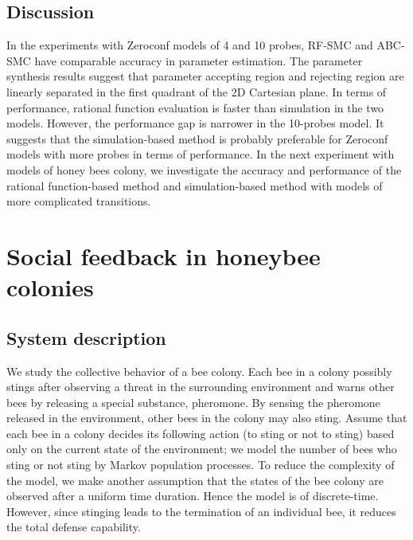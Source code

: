 \subsection{Discussion}
In the experiments with Zeroconf models of 4 and 10 probes, RF-SMC and ABC-SMC have comparable
accuracy in parameter estimation. The parameter synthesis results suggest that parameter accepting
region and rejecting region are linearly separated in the first quadrant of the 2D Cartesian plane.
In terms of performance, rational function evaluation is faster than simulation in the two models.
However, the performance gap is narrower in the 10-probes model. It suggests that the
simulation-based method is probably preferable for Zeroconf models with more probes in terms of
performance. In the next experiment with models of honey bees colony, we investigate the accuracy
and performance of the rational function-based method and simulation-based method with models of
more complicated transitions.

\section{Social feedback in honeybee colonies}
\subsection{System description}
We study the collective behavior of a bee colony. Each bee in a colony possibly stings after
observing a threat in the surrounding environment and warns other bees by releasing a special
substance, pheromone. By sensing the pheromone released in the environment, other bees in the colony
may also sting. Assume that each bee in a colony decides its following action (to sting or not to
sting) based only on the current state of the environment; we model the number of bees who sting or
not sting by Markov population processes. To reduce the complexity of the model, we make another
assumption that the states of the bee colony are observed after a uniform time duration. Hence the
model is of discrete-time. However, since stinging leads to the termination of an individual bee, it
reduces the total defense capability.

